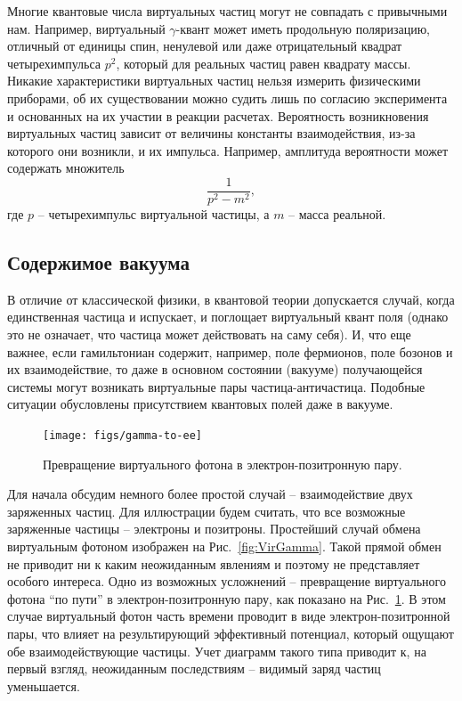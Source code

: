 Многие квантовые числа виртуальных частиц могут не совпадать с привычными нам. 
Например, виртуальный $\gamma$-квант может иметь продольную поляризацию, отличный от единицы спин, ненулевой или даже отрицательный квадрат четырехимпульса $p^2$, который для реальных частиц равен квадрату массы. 
Никакие характеристики виртуальных частиц нельзя измерить физическими приборами, об их существовании можно судить лишь по согласию эксперимента и основанных на их участии в реакции расчетах. 
Вероятность возникновения виртуальных частиц зависит от величины константы взаимодействия, из-за которого они возникли, и их импульса. 
Например, амплитуда вероятности может содержать множитель 
$$ \frac{1}{p^2 - m^2}, $$
где $p$ -- четырехимпульс виртуальной частицы, а $m$ -- масса реальной. 


\subsection{Содержимое вакуума}

В отличие от классической физики, в квантовой теории допускается случай, когда единственная частица и испускает, и поглощает виртуальный квант поля (однако это не означает, что частица может действовать на саму себя). 
И, что еще важнее, если гамильтониан содержит, например, поле фермионов, поле бозонов и их взаимодействие, то даже в основном состоянии (вакууме) получающейся системы могут возникать виртуальные пары частица-античастица. 
Подобные ситуации обусловлены присутствием квантовых полей даже в вакууме.

\begin{figure}[b]
\texttt{[image: figs/gamma-to-ee]}
\caption{Превращение виртуального фотона в электрон-позитронную пару.}
\label{fig:gamma-to-ee}
\end{figure}

Для начала обсудим немного более простой случай -- взаимодействие двух заряженных частиц.
Для иллюстрации будем считать, что все возможные заряженные частицы -- электроны и позитроны. 
Простейший случай обмена виртуальным фотоном изображен на Рис.~\ref{fig:VirGamma}. 
Такой прямой обмен не приводит ни к каким неожиданным явлениям и поэтому не представляет особого интереса. 
Одно из возможных усложнений -- превращение виртуального фотона ``по пути'' в электрон-позитронную пару, как показано на Рис.~\ref{fig:gamma-to-ee}. 
В этом случае виртуальный фотон часть времени проводит в виде электрон-позитронной пары, что влияет на результирующий эффективный потенциал, который ощущают обе взаимодействующие частицы. 
Учет диаграмм такого типа приводит к, на первый взгляд, неожиданным последствиям -- видимый заряд частиц уменьшается. 

